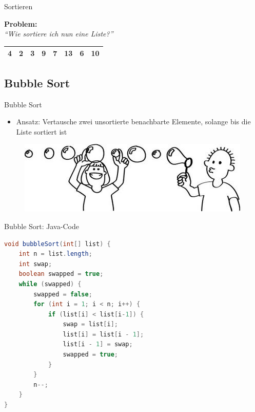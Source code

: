 \documentclass[18pt]{beamer}
\newcommand{\quotes}[1]{``#1''}
\begin{document}
\begin{frame}{Sortieren}
    \begin{block}{}
        \textbf{Problem:}\\
        \textit{\quotes{Wie sortiere ich nun eine Liste?}}
    \end{block}
    \vspace{.2in}
    \begin{center}
        \begin{tabular}{|c|c|c|c|c|c|c|c|}
            \hline
            4 & 2 & 3 & 9 & 7 & 13 & 6 & 10 \\
            \hline
        \end{tabular}
    \end{center}
\end{frame}

\subsection{Bubble Sort}

\begin{frame}{Bubble Sort}
    \begin{itemize}
        \item Ansatz: Vertausche zwei unsortierte benachbarte Elemente, solange bis die Liste sortiert ist
    \end{itemize}
    \vspace{.2in}
    \begin{figure}
        \includegraphics[scale=.5]{img/BubbleSort.jpg}
    \end{figure}
\end{frame}

\begin{frame}[fragile]{Bubble Sort: Java-Code}
    \begin{exampleblock}{}
        \begin{lstlisting}[language=Java,basicstyle=\scriptsize,basicstyle=\scriptsize]
void bubbleSort(int[] list) {
    int n = list.length;
    int swap;
    boolean swapped = true;
    while (swapped) {
        swapped = false;
        for (int i = 1; i < n; i++) {
            if (list[i] < list[i-1]) {
                swap = list[i];
                list[i] = list[i - 1];
                list[i - 1] = swap;
                swapped = true;
            }
        }
        n--;
    }
}
        \end{lstlisting}
    \end{exampleblock}
\end{frame}
\end{document}

